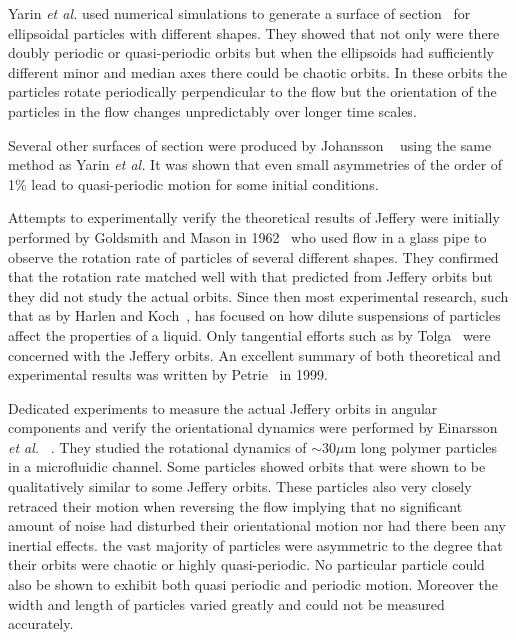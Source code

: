 Yarin \emph{et al.} used numerical simulations to generate a surface of section~\cite{SurfaceOfSection} for ellipsoidal particles with different shapes. They showed that not only were there doubly periodic or quasi-periodic orbits but when the ellipsoids had sufficiently different minor and median axes there could be chaotic orbits. In these orbits the particles rotate periodically perpendicular to the flow but the orientation of the particles in the flow changes unpredictably over longer time scales. %

Several other surfaces of section were produced by Johansson ~\cite{AntonThesis} using the same method as Yarin \emph{et al.} It was shown that even small asymmetries of the order of 1\% lead to quasi-periodic motion for some initial conditions.

Attempts to experimentally verify the theoretical results of Jeffery were initially performed by Goldsmith and Mason in 1962~\cite{Mason} who used flow in a glass pipe to observe the rotation rate of particles of several different shapes. They confirmed that the rotation rate matched well with that predicted from Jeffery orbits but they did not study the actual orbits. Since then most experimental research, such that as by Harlen and Koch~\cite{fibersspension}, has focused on how dilute suspensions of particles affect the properties of a liquid. Only tangential efforts such as by Tolga~\cite{Tolga} were concerned with the Jeffery orbits. An excellent summary of both theoretical and experimental results was written by Petrie~\cite{Petrie} in 1999.

Dedicated experiments to measure the actual Jeffery orbits in angular components and verify the orientational dynamics were performed by Einarsson \emph{et al.} ~\cite{JonasExperiment}. They studied the rotational dynamics of $\sim 30 \mu$m long polymer particles in a microfluidic channel. Some particles showed orbits that were shown to be qualitatively similar to some Jeffery orbits. These particles also very closely retraced their motion when reversing the flow implying that no significant amount of noise had disturbed their orientational motion nor had there been any inertial effects. the vast majority of particles were asymmetric to the degree that their orbits were chaotic or highly quasi-periodic. No particular particle could also be shown to exhibit both quasi periodic and periodic motion. Moreover the width and length of particles varied greatly and could not be measured accurately.

